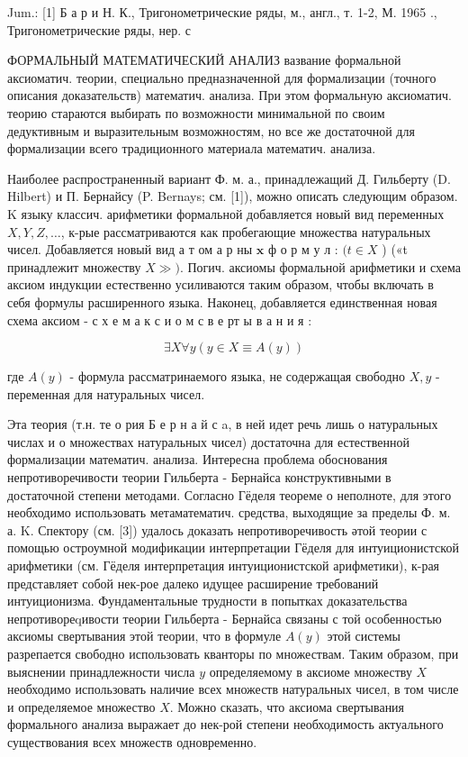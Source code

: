 \documentclass[10pt]{article}
\begin{document}
Jum.: [1] Б а р и Н. К., Тригонометрические ряды, м., англ., т. 1-2, М. 1965 ., Тригонометрические ряды, нер. с



ФОРМАЛЬНЫЙ МАТЕМАТИЧЕСКИЙ АНАЛИЗ вазвание формальной аксиоматич. теории, специально предназначенной для формализации (точного описания доказательств) математич. анализа. При этом формальную аксиоматич. теорию стараются выбирать по возможности минимальной по своим дедуктивным и выразительным возможностям, но все же достаточной для формализации всего традиционного материала математич. анализа.



Наиболее распространенный вариант Ф. м. а., принадлежащий Д. Гильберту (D. Hilbert) и П. Бернайсу (P. Bernays; см. [1]), можно описать следующим образом. $\mathrm{K}$ языку классич. арифметики формальной добавляется новый вид переменных $X, Y, Z, \ldots$, к-рые рассматриваются как пробегающие множества натуральных чисел. Добавляется новый вид а т ом а р ны $\mathbf{x}$ ф о р м у л : $(t \in X$ ) («t принадлежит множеству $X \gg)$. Погич. аксиомы формальной арифметики и схема аксиом индукции естественно усиливаются таким образом, чтобы включать в себя формулы расширенного языка. Наконец, добавляется единственная новая схема аксиом - с х е м а к с и о м с в е рт ы в а н и я :



\[

\exists X \forall y(y \in X \equiv A(y))

\]



где $A(y)$ - формула рассматринаемого языка, не содержащая свободно $X, y$ - переменная для натуральных чисел.



Эта теория (т.н. те о рия Б е р н а й с a, в ней идет речь лишь о натуральных числах и о множествах натуральных чисел) достаточна для естественной формализации математич. анализа. Интересна проблема обоснования непротиворечивости теории Гильберта - Бернайса конструктивными в достаточной степени методами. Согласно Гёделя теореме о неполноте, для этого необходимо использовать метаматематич. средства, выходящие за пределы Ф. м. а. K. Спектору (см. [3]) удалось доказать непротиворечивость әтой теории с помощью остроумной модификации интерпретации Гёделя для интуиционистской арифметики (см. Гёделя интерпретация интуиционистской арифметики), к-рая представляет собой нек-рое далеко идущее расширение требований интуиционизма. Фундаментальные трудности в попытках доказательства непротивореqивости теории Гильберта - Бернайса связаны с той особенностью аксиомы свертывания этой теории, что в формуле $A(y)$ этой системы разрепается свободно использовать кванторы по множествам. Таким образом, при выяснении принадлежности числа $y$ определяемому в аксиоме множеству $X$ необходимо использовать наличие всех множеств натуральных чисел, в том числе и определяемое множество $X$. Можно сказать, что аксиома свертывания формального анализа выражает до нек-рой степени необходимость актуального существования всех множеств одновременно.
\end{document}
